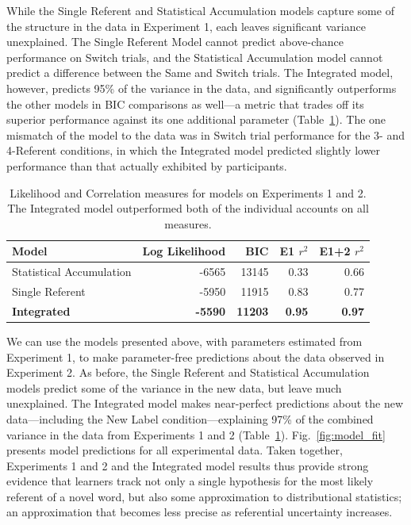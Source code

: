 \documentclass[authoryear,review]{elsarticle}
\begin{document}
While the Single Referent and Statistical Accumulation models capture some of the structure in the data in Experiment 1, each leaves significant variance unexplained. The Single Referent Model cannot predict above-chance performance on Switch trials, and the Statistical Accumulation model cannot predict a difference between the Same and Switch trials. The Integrated model, however, predicts 95\% of the variance in the data, and significantly outperforms the other models in BIC comparisons as well---a metric that trades off its superior performance against its one additional parameter (Table~\ref{tab:model}). The one mismatch of the model to the data was in Switch trial performance for the 3- and 4-Referent conditions, in which the Integrated model predicted slightly lower performance than that actually exhibited by participants. 

\begin{table}[tb]
\begin{center}
\begin{tabular}{lrrrr}
  Model & Log Likelihood & BIC & E1 $r^{2}$ & E1+2 $r^{2}$ \\ 
  \hline
  Statistical Accumulation & -6565 & 13145 & 0.33 & 0.66 \\ 
  Single Referent & -5950 & 11915 & 0.83 & 0.77 \\ 
  \textbf{Integrated} & \textbf{-5590} & \textbf{11203} & \textbf{0.95} & \textbf{0.97} \\ 
  \hline
\end{tabular}
\end{center}
\caption{\label{tab:model}Likelihood and Correlation measures for models on Experiments 1 and 2. The Integrated model outperformed both of the individual accounts on all measures.}
\end{table}



We can use the models presented above, with parameters estimated from Experiment 1, to make parameter-free predictions about the data observed in Experiment 2. As before, the Single Referent and Statistical Accumulation models predict some of the variance in the new data, but leave much unexplained. The Integrated model makes near-perfect predictions about the new data---including the New Label condition---explaining 97\% of the combined variance in the data from Experiments 1 and 2 (Table~\ref{tab:model}). Fig.~\ref{fig:model_fit} presents model predictions for all experimental data. Taken together, Experiments 1 and 2 and the Integrated model results thus provide strong evidence that learners track not only a single hypothesis for the most likely referent of a novel word, but also some approximation to distributional statistics; an approximation that becomes less precise as referential uncertainty increases.
\end{document}
